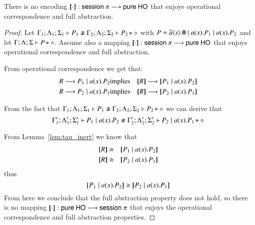 \begin{theorem}
    There is no encoding 
$[\!\![\cdot]\!\!]: \mathsf{session\ }\pi \longrightarrow  \mathsf{pure\ HO} $ that enjoys
	operational correspondence and full abstraction. 
\end{theorem}

\begin{proof}
	Let $\Gamma_1; \Lambda_1; \Sigma_1 \vdash P_1 \not\cong \Gamma_2; \Lambda_2; \Sigma_2 \vdash P_2 \triangleright \diamond$
	with $P = \overline{a} \langle s \rangle . \mathbf{0} \;|\; a (x) . P_1 \;|\; a (x) . P_2$ and
	let $\Gamma; \Lambda; \Sigma \vdash P \triangleright \diamond$. Assume also a mapping
	$[\!\![\cdot]\!\!]: \mathsf{session\ }\pi \longrightarrow  \mathsf{pure\ HO} $ that enjoys
	operational correspondence and full abstraction.

	From operational correspondence we get that:
	\begin{eqnarray*}
		R \red P_1 \Par \bacc{a}{x} P_2 &\textrm{implies}& \map{R} \red \map{P_1 \Par \bacc{a}{x} P_2}\\
		R \red P_2 \Par \bacc{a}{x} P_1 &\textrm{implies}& \map{R} \red \map{P_2 \Par \bacc{a}{x} P_1}
	\end{eqnarray*}

	From the fact that
	$\Gamma_1; \Lambda_1; \Sigma_1 \vdash P_1 \not\cong \Gamma_2; \Lambda_2; \Sigma_2 \vdash P_2 \triangleright \diamond$
	we can derive that
	\[
		\Gamma_1'; \Lambda_1'; \Sigma_1' \vdash P_1 \;|\; a (x) . P_2 \not\cong \Gamma_2'; \Lambda_2'; \Sigma_2' \vdash P_2 \;|\; a (x) . P_1 \triangleright \diamond
	\]

	From Lemma~\ref{lem:tau_inert} we know that
	\begin{eqnarray*}
		\map{R} &\cong& \map{P_1 \Par \bacc{a}{x} P_2}\\
		\map{R} &\cong& \map{P_2 \Par \bacc{a}{x} P_1}
	\end{eqnarray*}
	\noi thus
	\[
		\map{P_1 \Par \bacc{a}{x} P_2} \cong \map{P_2 \Par \bacc{a}{x} P_1}
	\]
	From here we conclude that the full abstraction property does not hold,
	so there is no mapping $[\!\![\cdot]\!\!]: \mathsf{pure\ HO} \longrightarrow \mathsf{session\ }\pi$ that enjoys
	the operational correspondence and full abstraction properties.
\end{proof}


